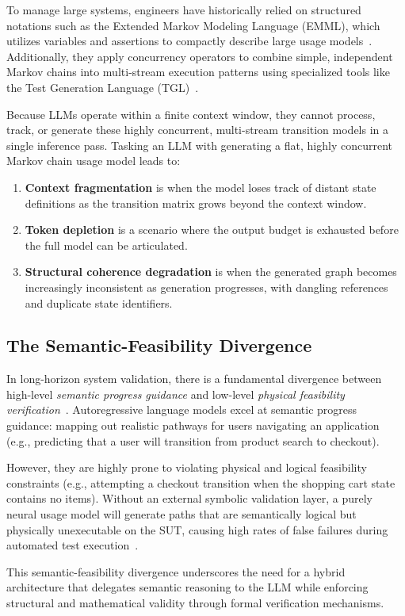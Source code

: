 To manage large systems, engineers have historically relied on structured notations such as the Extended Markov Modeling Language (EMML), which utilizes variables and assertions to compactly describe large usage models~\cite{emml_usage_models}. Additionally, they apply concurrency operators to combine simple, independent Markov chains into multi-stream execution patterns using specialized tools like the Test Generation Language (TGL)~\cite{whittaker1993markov,whittaker1994markov}.

Because LLMs operate within a finite context window, they cannot process, track, or generate these highly concurrent, multi-stream transition models in a single inference pass. Tasking an LLM with generating a flat, highly concurrent Markov chain usage model leads to:
\begin{enumerate}
    \item \textbf{Context fragmentation} is when the model loses track of distant state definitions as the transition matrix grows beyond the context window.
    \item \textbf{Token depletion} is a scenario where the output budget is exhausted before the full model can be articulated.
    \item \textbf{Structural coherence degradation} is when the generated graph becomes increasingly inconsistent as generation progresses, with dangling references and duplicate state identifiers.
\end{enumerate}



\subsection{The Semantic-Feasibility Divergence}
\label{subsec:semantic_feasibility}

In long-horizon system validation, there is a fundamental divergence between high-level \emph{semantic progress guidance} and low-level \emph{physical feasibility verification}~\cite{neuro_symbolic_framework}. Autoregressive language models excel at semantic progress guidance: mapping out realistic pathways for users navigating an application (e.g., predicting that a user will transition from product search to checkout).

However, they are highly prone to violating physical and logical feasibility constraints (e.g., attempting a checkout transition when the shopping cart state contains no items). Without an external symbolic validation layer, a purely neural usage model will generate paths that are semantically logical but physically unexecutable on the SUT, causing high rates of false failures during automated test execution~\cite{taxonomy_mbt, markov_reliability}.

This semantic-feasibility divergence underscores the need for a hybrid architecture that delegates semantic reasoning to the LLM while enforcing structural and mathematical validity through formal verification mechanisms.
